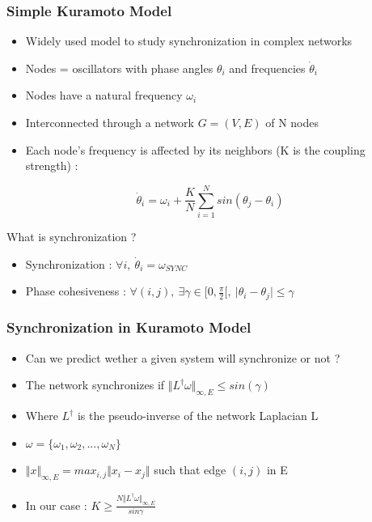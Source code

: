 \documentclass[xcolor=dvipsnames]{beamer}
\begin{document}
\begin{frame}
	\frametitle{Simple Kuramoto Model}
	
	\begin{itemize}
		\item Widely used model to study synchronization in complex networks
		\item Nodes = oscillators with phase angles $ \theta_i $ and frequencies $ \dot{\theta}_i $
		\item Nodes have a natural frequency $\omega_i $
		\item Interconnected through a network $G=(V,E)$ of N nodes
		\item Each node's frequency is affected by its neighbors (K is the coupling strength) :
	\end{itemize}
	\begin{center}
		\[ \dot{\theta}_i = \omega_i + \frac{K}{N} \sum_{i=1}^{N} sin(\theta_j - \theta_i) \]
	\end{center}
	What is synchronization ?
	\begin{itemize}
		\item Synchronization : $ \forall i,\ \dot{\theta}_i = \omega_{SYNC} $
		\item Phase cohesiveness : $ \forall (i,j),\ \exists \gamma \in [0,\frac{\pi}{2}[,\ \vert \theta_i - \theta_j \vert \leq \gamma $
	\end{itemize}	
\end{frame}



\begin{frame}
	\frametitle{Synchronization in Kuramoto Model}
	
	\begin{itemize}
		\item Can we predict wether a given system will synchronize or not ?
		\item The network synchronizes if $ \Vert L^{\dagger} \omega \Vert_{\infty,E} \leq sin(\gamma) $ 
		\item Where $L^{\dagger}$ is the pseudo-inverse of the network Laplacian L
		\item $ \omega = \{ \omega_1, \omega_2,..., \omega_N \}$
		\item $ \Vert x \Vert_{\infty,E} = max_{i,j} \Vert x_i - x_j \Vert $ such that edge $(i,j)$ in E
		\item In our case : $ K \geq \frac{N \Vert L^{\dagger} \omega \Vert_{\infty,E}}{sin \gamma} $
	\end{itemize}
\end{frame}
\end{document}
